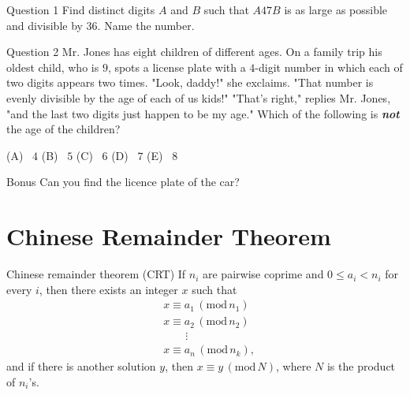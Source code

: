 \documentclass[professionalfont, 12pt, handout, t]{beamer} %
\theoremstyle{plain}
\theoremstyle{definition}
\newcommand{\Mod}[1]{\, (\mathrm{mod} \, #1)}
\begin{document}
\begin{frame}{Question 1}
    Find distinct digits $A$ and $B$ such that $A47B$ is as large as possible and divisible by 36.
    Name the number.
\end{frame}

\begin{frame}{}
    
\end{frame}

\begin{frame}{Question 2}
    Mr. Jones has eight children of different ages.
    On a family trip his oldest child, who is $9$, spots a license plate with a $4$-digit number in which each of two digits appears two times.
    "Look, daddy!" she exclaims.
    "That number is evenly divisible by the age of each of us kids!"
    "That's right," replies Mr. Jones, "and the last two digits just happen to be my age."
    Which of the following is \textbf{\emph{not}} the age of the children?
    \bigskip

    (A) \, $4$ \qquad (B) \, $5$ \qquad (C) \, $6$ \qquad (D) \, $7$ \qquad (E) \, $8$
\end{frame}

\begin{frame}{}
    
\end{frame}

\begin{frame}{}
    
\end{frame}

\begin{frame}{Bonus}
    Can you find the licence plate of the car? 
\end{frame}

\section{Chinese Remainder Theorem}

\begin{frame}{Chinese remainder theorem (CRT)}
    If $n_i$ are pairwise coprime and $0\leq a_i < n_i$ for every $i$, then there exists an integer $x$ such that
    \begin{align*}
        & x \equiv a_1 \Mod {n_1}\\
        & x \equiv a_2 \Mod {n_2}\\
        & \qquad \vdots\\
        & x \equiv a_n \Mod {n_k},
    \end{align*}
    and if there is another solution $y$, then $x \equiv y \Mod N$, where $N$ is the product of $n_i$'s.
\end{frame}
\end{document}
